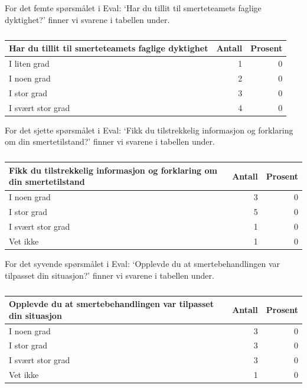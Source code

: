 \documentclass[
]{article}
\begin{document}
For det femte spørsmålet i Eval: `Har du tillit til smerteteamets
faglige dyktighet?' finner vi svarene i tabellen under.

\begin{table}

\caption{\label{tab:evalu}}
\centering
\begin{tabular}[t]{l|r|r}
\hline
Har du tillit til smerteteamets faglige dyktighet & Antall  & Prosent\\
\hline
I liten grad & 1 & 0\\
\hline
I noen grad & 2 & 0\\
\hline
I stor grad & 3 & 0\\
\hline
I svært stor grad & 4 & 0\\
\hline
\end{tabular}
\end{table}

For det sjette spørsmålet i Eval: `Fikk du tilstrekkelig informasjon og
forklaring om din smertetilstand?' finner vi svarene i tabellen under.

\begin{table}

\caption{\label{tab:evalu}}
\centering
\begin{tabular}[t]{l|r|r}
\hline
Fikk du tilstrekkelig informasjon og forklaring om din smertetilstand & Antall  & Prosent\\
\hline
I noen grad & 3 & 0\\
\hline
I stor grad & 5 & 0\\
\hline
I svært stor grad & 1 & 0\\
\hline
Vet ikke & 1 & 0\\
\hline
\end{tabular}
\end{table}

For det syvende spørsmålet i Eval: `Opplevde du at smertebehandlingen
var tilpasset din situasjon?' finner vi svarene i tabellen under.

\begin{table}

\caption{\label{tab:evalu}}
\centering
\begin{tabular}[t]{l|r|r}
\hline
Opplevde du at smertebehandlingen var tilpasset din situasjon & Antall  & Prosent\\
\hline
I noen grad & 3 & 0\\
\hline
I stor grad & 3 & 0\\
\hline
I svært stor grad & 3 & 0\\
\hline
Vet ikke & 1 & 0\\
\hline
\end{tabular}
\end{table}
\end{document}
